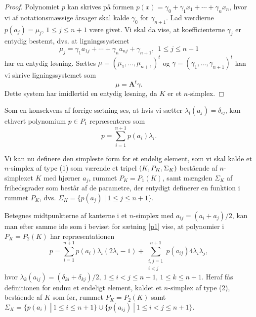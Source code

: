 \begin{proof}
Polynomiet $p$ kan skrives på formen $p(x)=\gamma_0 + \gamma_1 x_1 +\cdots+ 
\gamma_n x_n$, hvor vi af notationsmæssige årsager skal kalde $\gamma_0$
for $\gamma_{n+1}$. Lad værdierne $p(a_j)=\mu_j$, $1\leq j\leq n+1$ være
givet. Vi skal da vise, at koefficienterne $\gamma_j$ er entydig bestemt, 
dvs. at ligningssystemet
\begin{equation}
   \mu_j = \gamma_1 a_{1j} + \cdots + \gamma_n a_{nj} + \gamma_{n+1},\ \
   1 \leq j \leq n+1 
\end{equation}
har en entydig løsning. Sættes $\mu=(\mu_1,\ldots,\mu_{n+1})^t$ og 
$\gamma=(\gamma_1,\ldots,\gamma_{n+1})^t$ kan vi skrive ligningssystemet
som
\begin{equation} 
 \mu = {\mathbf A}^t \gamma . 
\end{equation}
Dette system har imidlertid en entydig løsning, da $K$ er et $n$-simplex.
\end{proof}

\begin{remark}
Som en konsekvens af forrige sætning ses, at hvis vi sætter 
$\lambda_i(a_j) = \delta_{ij}$, kan ethvert polynomium 
$p\in P_1$ repræsenteres som 
\begin{equation} 
  p=\sum_{i=1}^{n+1}p(a_i)\lambda_i . 
\end{equation} 
\end{remark}
Vi kan nu definere den simpleste form for et endelig element, 
som vi skal kalde et $n$-simplex af type (1) som værende et 
tripel $(K,P_K,\Sigma_K)$ bestående af $n$-simplexet $K$ med hjørner  
$a_j$, rummet $P_K = P_1(K)$, samt mængden $\Sigma_K$ af 
frihedsgrader som består af de parametre, der entydigt definerer 
en funktion i rummet $P_K$, dvs. 
$\Sigma_K = \{ p(a_j)\ |\ 1 \leq j \leq n+1 \}$.

Betegnes midtpunkterne af kanterne i et $n$-simplex med 
$a_{ij}=(a_i+a_j)/2$, kan man efter samme ide som i beviset for sætning
\ref{p1} vise, at polynomier i $P_K=P_2(K)$ har repræsentationen
\begin{equation}
   p=\sum_{i=1}^{n+1}p(a_i)\lambda_i (2\lambda_i-1) + 
     \sum_{\substack{i,j=1 \\ i<j}}^{n+1} p(a_{ij}) 4\lambda_i
     \lambda_j ,  
\end{equation}
hvor $\lambda_k(a_{ij})=(\delta_{ki}+\delta_{kj})/2$, 
$1 \leq i<j \leq n+1$, $1 \leq k \leq n+1$. Heraf fås definitionen
for endnu et endeligt element, kaldet et $n$-simplex af type (2), 
bestående af $K$ som før, rummet $P_K=P_2(K)$ samt $\Sigma_K=\{p(a_i)\ |\ 1\leq
i\leq n+1 \} \cup \{ p(a_{ij})\ |\ 1\leq i<j \leq n+1\}$.

